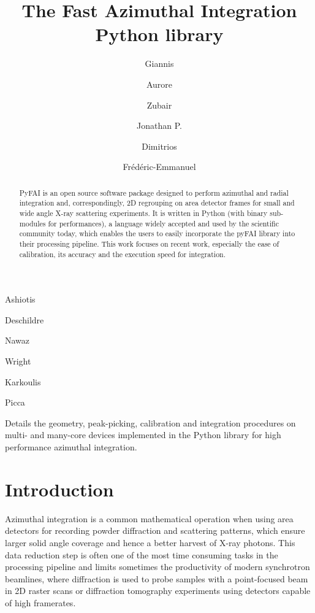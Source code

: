 \documentclass{iucr}
\begin{document}
\title{The Fast Azimuthal Integration Python library}

    \author[a]{Giannis}{Ashiotis}
    \author[a]{Aurore}{Deschildre}
    \author[b]{Zubair}{Nawaz}
    \author[a]{Jonathan P.}{Wright}
    \author[a]{Dimitrios}{Karkoulis}
    \author[c]{Fr\'ed\'eric-Emmanuel}{Picca}


\maketitle

\begin{synopsis}
Details the geometry, peak-picking, calibration and integration procedures
on multi- and many-core devices implemented in the Python library for high
performance azimuthal integration.
\end{synopsis}

\begin{abstract}
PyFAI is an open source software package designed to perform azimuthal and
radial integration and, correspondingly, 2D regrouping on area detector frames for small and wide
angle X-ray scattering experiments.
It is written in Python (with binary sub-modules for performances), a
language widely accepted and used by the scientific community today, which enables
the users to easily incorporate the pyFAI library into their processing pipeline.
This work focuses on recent work, especially the ease of
calibration, its accuracy and the execution speed for integration.
\end{abstract}

\section{Introduction}

Azimuthal integration is a common mathematical operation when using area
detectors for recording powder diffraction and scattering patterns, which
ensure larger solid angle coverage and hence a better harvest of X­-ray photons.
This data reduction step is often one of the most time ­consuming tasks in the
processing pipeline and limits sometimes the productivity of modern synchrotron
beamlines, where diffraction is used to probe samples with a point-focused
beam in 2D raster scans or diffraction tomography experiments using
detectors capable of high framerates.
\end{document}

